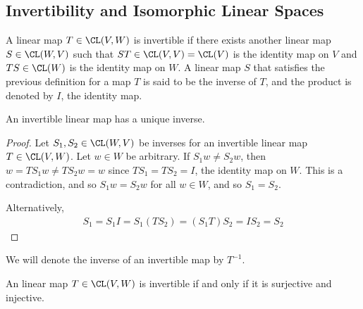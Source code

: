 \documentclass{article}
\begin{document}
\subsection{Invertibility and Isomorphic Linear Spaces}
  \begin{defn}
    A linear map $T \in \CL(V, W)$ is invertible if there exists another linear map $S \in \CL(W, V)$ such that $ST \in \CL(V, V) = \CL(V)$ is the identity map on $V$ and $TS \in \CL(W)$ is
    the identity map on $W$. A linear map $S$ that satisfies the previous definition for a map $T$ is said to be the inverse of $T$, and the product is denoted by $I$, the identity map.
  \end{defn}
  \begin{prop}
    An invertible linear map has a unique inverse.
  \end{prop}
  \begin{proof}
    Let $S_1, S_2 \in \CL(W, V)$ be inverses for an invertible linear map $T \in \CL(V, W)$. Let $w \in W$ be arbitrary. If $S_1w \neq S_2w$, then $w = TS_1w \neq TS_2w = w$ since $TS_1 =
    TS_2 = I$, the identity map on $W$. This is a contradiction, and so $S_1w = S_2w$ for all $w \in W$, and so $S_1 = S_2$.

    Alternatively,
    \begin{align*}
      S_1 = S_1I = S_1(TS_2) = (S_1T)S_2 = IS_2 = S_2
    \end{align*}
  \end{proof}
  We will denote the inverse of an invertible map by $T^{-1}$.
  \begin{prop}
    An linear map $T \in \CL(V, W)$ is invertible if and only if it is surjective and injective.
  \end{prop}
\end{document}
